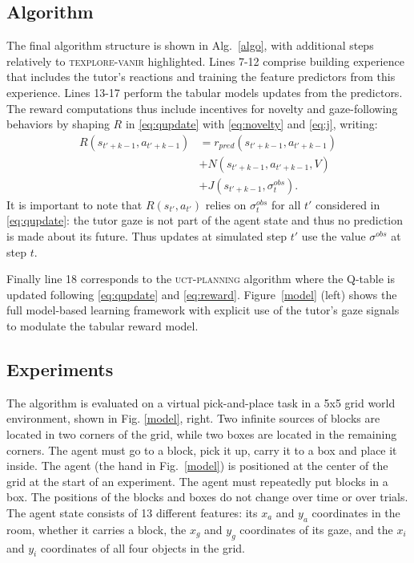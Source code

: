 \documentclass[letterpaper, 10 pt, conference]{ieeeconf}  %
\begin{document}
\subsection{Algorithm}

The final algorithm structure is shown in Alg.~\ref{algo}, with additional steps relatively to \textsc{texplore-vanir} highlighted. Lines 7-12 comprise building experience that includes the tutor's reactions and training the feature predictors from this experience. Lines 13-17 perform the tabular models updates from the predictors. The reward computations thus include incentives for novelty and gaze-following behaviors by shaping $R$ in \eqref{eq:qupdate} with \eqref{eq:novelty} and \eqref{eq:j}, writing:
\begin{equation}
\label{eq:reward}
\begin{split}
R(s_{t'+k-1},a_{t'+k-1}) & = r_{pred}(s_{t'+k-1},a_{t'+k-1}) \\
& + N(s_{t'+k-1},a_{t'+k-1},V) \\
& + J(s_{t'+k-1},\sigma^{obs}_t).
\end{split}
\end{equation}
It is important to note that $R(s_{t'},a_{t'})$ relies on $\sigma^{obs}_t$ for all $t'$ considered in \eqref{eq:qupdate}: the tutor gaze is not part of the agent state and thus no prediction is made about its future. Thus updates at simulated step $t'$ use the value $\sigma^{obs}$ at step $t$.

Finally line 18 corresponds to the \textsc{uct-planning} algorithm where the Q-table is updated following \eqref{eq:qupdate} and \eqref{eq:reward}. Figure~\ref{model} (left) shows the full model-based learning framework with explicit use of the tutor's gaze signals to modulate the tabular reward model.

\subsection{Experiments}

The algorithm is evaluated on a virtual pick-and-place task in a 5x5 grid world environment, shown in Fig. \ref{model}, right. Two infinite sources of blocks are located in two corners of the grid, while two boxes are located in the remaining corners. The agent must go to a block, pick it up, carry it to a box and place it inside. The agent (the hand in Fig.~\ref{model}) is positioned at the center of the grid at the start of an experiment. The agent must repeatedly put blocks in a box. The positions of the blocks and boxes do not change over time or over trials. The agent state consists of 13 different features: its $x_a$ and $y_a$ coordinates in the room, whether it carries a block, the $x_g$ and $y_g$ coordinates of its gaze, and the $x_i$ and $y_i$ coordinates of all four objects in the grid.
\end{document}
